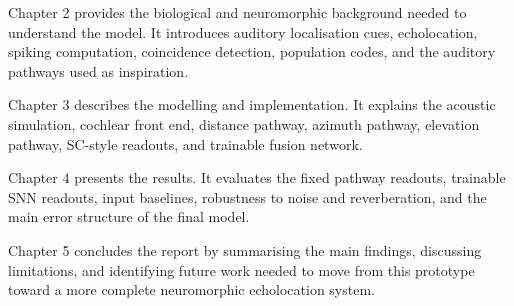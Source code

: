 Chapter 2 provides the biological and neuromorphic background needed to understand the model. It introduces auditory localisation cues, echolocation, spiking computation, coincidence detection, population codes, and the auditory pathways used as inspiration.

Chapter 3 describes the modelling and implementation. It explains the acoustic simulation, cochlear front end, distance pathway, azimuth pathway, elevation pathway, SC-style readouts, and trainable fusion network.

Chapter 4 presents the results. It evaluates the fixed pathway readouts, trainable SNN readouts, input baselines, robustness to noise and reverberation, and the main error structure of the final model.

Chapter 5 concludes the report by summarising the main findings, discussing limitations, and identifying future work needed to move from this prototype toward a more complete neuromorphic echolocation system.
